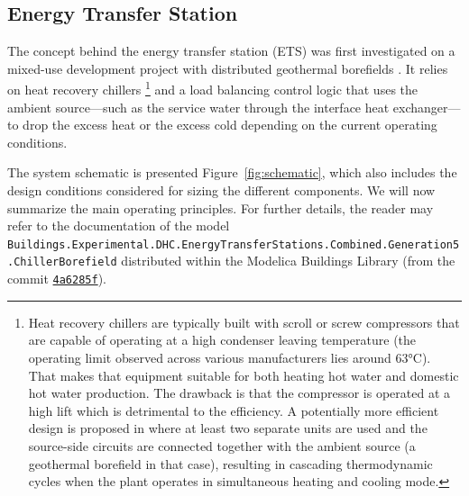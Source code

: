\subsection{Energy Transfer Station} \label{sec:ets}

The concept behind the energy transfer station (ETS) was first investigated on a mixed-use development project with distributed geothermal borefields \citep{WetterHu2019}.
It relies on heat recovery chillers%
\footnote{Heat recovery chillers are typically built with scroll or screw compressors that are capable of operating at a high condenser leaving temperature (the operating limit observed across various manufacturers lies around 63°C). That makes that equipment suitable for both heating hot water and domestic hot water production. The drawback is that the compressor is operated at a high lift which is detrimental to the efficiency. A potentially more efficient design is proposed in \cite{Cline2020} where at least two separate units are used and the source-side circuits are connected together with the ambient source (a geothermal borefield in that case), resulting in cascading thermodynamic cycles when the plant operates in simultaneous heating and cooling mode.}
and a load balancing control logic that uses the ambient source---such as the service water through the interface heat exchanger---to drop the excess heat or the excess cold depending on the current operating conditions.

The system schematic is presented Figure~\ref{fig:schematic}, which also includes the design conditions considered for sizing the different components.
We will now summarize the main operating principles. For further details, the reader may refer to the documentation of the model \lstinline|Buildings.Experimental.DHC.EnergyTransferStations.Combined.Generation5.ChillerBorefield| distributed within the Modelica Buildings Library (from the commit \href{https://github.com/lbl-srg/modelica-buildings/tree/4a6285f}{\lstinline|4a6285f|}).

